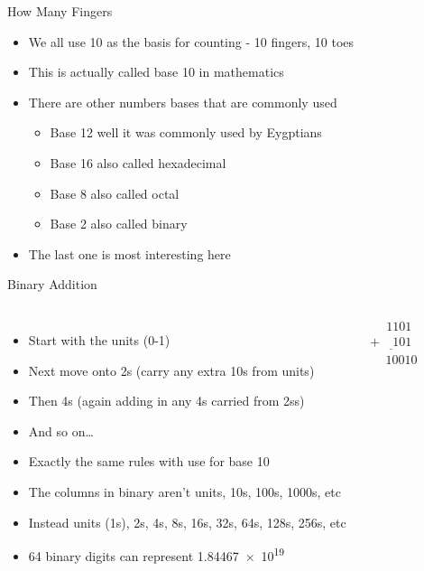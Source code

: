 \documentclass{beamer}
\begin{document}
\begin{frame}{How Many Fingers}
  \begin{itemize}
  \item
    We all use 10 as the basis for counting - 10 fingers, 10 toes
  \item
    This is actually called base 10 in mathematics
  \item
    There are other numbers bases that are commonly used
    \begin{itemize}
    \item
      Base 12 well it was commonly used by Eygptians 
    \item
      Base 16 also called hexadecimal
    \item
      Base 8 also called octal
    \item
      Base 2 also called binary
    \end{itemize}
  \item
    The last one is most interesting here
  \end{itemize}
\end{frame}


\begin{frame}{Binary Addition}
  \begin{columns}
    \begin{itemize}
    \item
      Start with the units (0-1) 
    \item
      Next move onto 2s (carry any extra 10s from units)
    \item
      Then 4s (again adding in any 4s carried from 2ss)
    \item
      And so on\dots
    \item
      Exactly the same rules with use for base 10
    \item
      The columns in binary aren't units, 10s, 100s, 1000s, etc
    \item
      Instead units (1s), 2s, 4s, 8s, 16s, 32s, 64s, 128s, 256s, etc
    \item
      64 binary digits can represent \num{1.84467e19}
    \end{itemize}

    \begin{equation*}
      \begin{array}{c}
        \phantom{+9}1101\\
        \underline{+\phantom{99}101}\\
        \phantom{+}10010\\
      \end{array}
    \end{equation*}
  \end{columns}
  
\end{frame}
\end{document}
